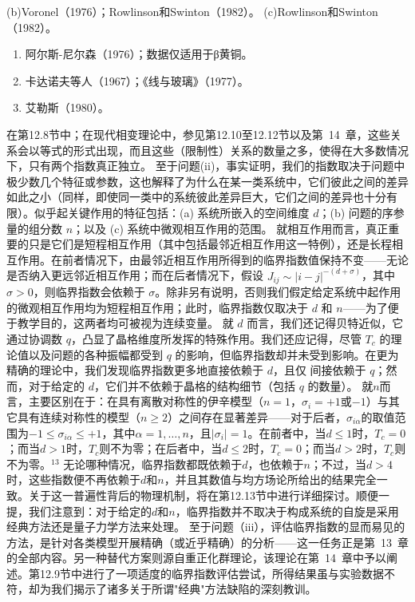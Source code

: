 (b)Voronel（1976）；Rowlinson和Swinton（1982）。
(c)Rowlinson和Swinton（1982）。
\begin{enumerate}
\def\labelenumi{(\alph{enumi})}
\setcounter{enumi}{3}
\item
  阿尔斯-尼尔森（1976）；数据仅适用于β黄铜。
\item
  卡达诺夫等人（1967）；《线与玻璃》（1977）。
\item
  艾勒斯（1980）。
\end{enumerate}
在第12.8节中；在现代相变理论中，参见第12.10至12.12节以及第~14~章，这些关系会以等式的形式出现，而且这些（限制性）关系的数量之多，使得在大多数情况下，只有两个指数真正独立。
至于问题(ii)，事实证明，我们的指数取决于问题中极少数几个特征或参数，这也解释了为什么在某一类系统中，它们彼此之间的差异如此之小（同样，即使同一类中的系统彼此差异巨大，它们之间的差异也十分有限）。似乎起关键作用的特征包括：(a) 系统所嵌入的空间维度 \(d\)；(b) 问题的序参量的组分数 \(n\)；以及 (c) 系统中微观相互作用的范围。
就相互作用而言，真正重要的只是它们是短程相互作用（其中包括最邻近相互作用这一特例），还是长程相互作用。在前者情况下，由最邻近相互作用所得到的临界指数值保持不变——无论是否纳入更远邻近相互作用；而在后者情况下，假设 \(J_{ij} \sim |i-j|^{-(d+\sigma)}\)，其中 \(\sigma > 0\)，则临界指数会依赖于 \(\sigma\)。除非另有说明，否则我们假定给定系统中起作用的微观相互作用均为短程相互作用；此时，临界指数仅取决于 \(d\) 和 \(n\)——为了便于教学目的，这两者均可被视为连续变量。
就 \(d\) 而言，我们还记得贝特近似，它通过协调数 \(q\)，凸显了晶格维度所发挥的特殊作用。我们还应记得，尽管 \(T_c\) 的理论值以及问题的各种振幅都受到 \(q\) 的影响，但临界指数却并未受到影响。在更为精确的理论中，我们发现临界指数更多地直接依赖于 \(d\)，且仅
间接依赖于 \(q\)；然而，对于给定的 \(d\)，它们并不依赖于晶格的结构细节（包括 \(q\) 的数量）。
就\(n\)而言，主要区别在于：在具有离散对称性的伊辛模型（\(n=1\)，\(\sigma_i=+1\)或\(-1\)）与其它具有连续对称性的模型（\(n\geq2\)）之间存在显著差异——对于后者，\(\sigma_{i\alpha}\)的取值范围为\(-1\leq\sigma_{i\alpha}\leq+1\)，其中\(\alpha=1,\ldots,n\)，且\(|\sigma_i|=1\)。在前者中，当\(d\leq1\)时，\(T_c=0\)；而当\(d>1\)时，\(T_c\)则不为零；在后者中，当\(d\leq2\)时，\(T_c=0\)；而当\(d>2\)时，\(T_c\)则不为零。\(^{13}\) 无论哪种情况，临界指数都既依赖于\(d\)，也依赖于\(n\)；不过，当\(d>4\)时，这些指数便不再依赖于\(d\)和\(n\)，并且其数值与均方场论所给出的结果完全一致。关于这一普遍性背后的物理机制，将在第12.13节中进行详细探讨。顺便一提，我们注意到：对于给定的\(d\)和\(n\)，临界指数并不取决于构成系统的自旋是采用经典方法还是量子力学方法来处理。
至于问题（iii），评估临界指数的显而易见的方法，是针对各类模型开展精确（或近乎精确）的分析——这一任务正是第~13~章的全部内容。另一种替代方案则源自重正化群理论，该理论在第~14~章中予以阐述。第12.9节中进行了一项适度的临界指数评估尝试，所得结果虽与实验数据不符，却为我们揭示了诸多关于所谓"经典"方法缺陷的深刻教训。
